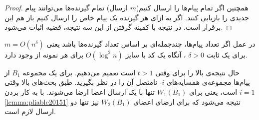\begin{proof}
    همچنین اگر تمام پیام‌ها را ارسال کنیم($m$
    ارسال) تمام گیرنده‌ها می‌توانند پیام جدیدی را بازیابی کنند. اگر به ازای هر گیرنده یک پیام خاص را ارسال کنیم باز هم این برقرار است. در نتیجه با کمینه گرفتن از این سه نتیجه، قضیه اثبات می‌شود.
\end{proof}
\begin{corollary}
    در عمل اگر تعداد پیام‌ها، چندجمله‌ای بر اساس تعداد گیرنده‌ها باشد یعنی
    $m = O(n^{\delta})$
    برای یک ثابت
    $\delta > 0$
    ، آنگاه یک کد با سایز
    $O(\log^2 n)$
    برای هر نمونه از
    وجود دارد.
\end{corollary}

حال نتیجه‌ی بالا را برای
وقتی
$t > 1$
است تعمیم می‌دهیم. برای یک مجموعه
$B_1$
از پیام‌ها مجموعه‌ی همسایه‌های
$i$- نامتصل آن را در نظر بگیرید. طبق بحث‌های بالا وقتی
$i = 1$
است، یعنی برای
$W_1(B_1)$
تنها با یک ارسال اعضا ارضا می‌شوند. با به کار بردن
\autoref{lemma:pliable20151}
نتیجه می‌شود که برای ارضای اعضای
$W_2(B_1)$
نیز تنها دو ارسال لازم است.

